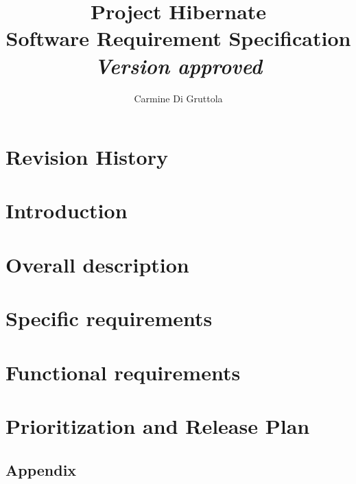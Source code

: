 \documentclass{report}
\title{{\huge Project Hibernate \\ Software Requirement Specification} \\  \textit{Version \myversion approved}}
\author{Carmine Di Gruttola}
\date{}
\begin{document}
    \maketitle
    
    \tableofcontents
    
    \chapter*{Revision History}
    
    
    \chapter{Introduction}
    
    
    \chapter{Overall description}
    
    
    \chapter{Specific requirements}
    
    
    \chapter{Functional requirements}
    
    
    \chapter{Prioritization and Release Plan}
    
    
    \begin{appendices}
        \chapter{Appendix}
        
    \end{appendices}
    
    
    
\end{document}
